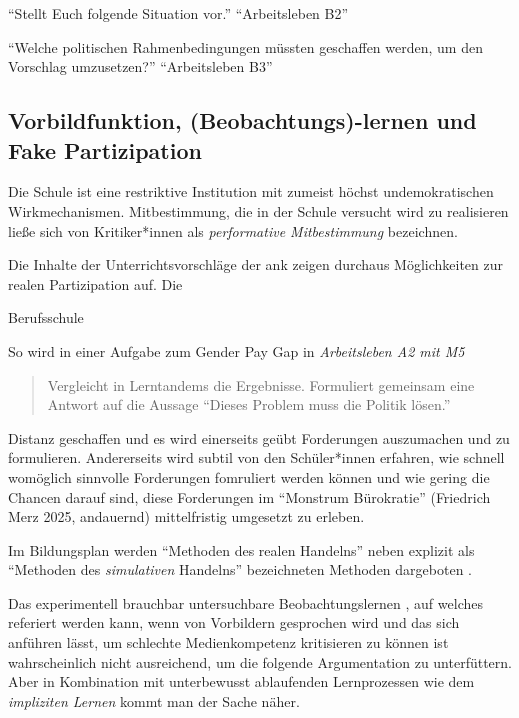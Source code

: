 \enquote{Stellt Euch folgende Situation vor.} \enquote{Arbeitsleben B2}

\enquote{Welche politischen Rahmenbedingungen müssten geschaffen werden, um den Vorschlag umzusetzen?} \enquote{Arbeitsleben B3}

\subsection{Vorbildfunktion, (Beobachtungs)-lernen und Fake Partizipation \label{fakePartizipation}}
Die Schule ist eine restriktive Institution mit zumeist höchst undemokratischen Wirkmechanismen.
Mitbestimmung, die in der Schule versucht wird zu realisieren ließe sich von Kritiker*innen als \emph{performative Mitbestimmung} bezeichnen. 


Die Inhalte der Unterrichtsvorschläge der \gls{ank} zeigen durchaus Möglichkeiten zur realen Partizipation auf. Die  

Berufsschule 

So wird in einer Aufgabe zum Gender Pay Gap in \emph{Arbeitsleben A2 mit M5}

\begin{quote}
    Vergleicht in Lerntandems die Ergebnisse. Formuliert gemeinsam eine Antwort auf die Aussage \enquote{Dieses Problem muss die Politik lösen.}
\end{quote}

Distanz geschaffen und es wird einerseits geübt Forderungen auszumachen und zu formulieren. Andererseits wird subtil von den Schüler*innen erfahren, wie schnell womöglich sinnvolle Forderungen fomruliert werden können und wie gering die Chancen darauf sind, diese Forderungen im \enquote{Monstrum Bürokratie} (Friedrich Merz 2025, andauernd) mittelfristig umgesetzt zu erleben. 

Im Bildungsplan werden \enquote{Methoden des realen Handelns} \autocite[13]{bplan} neben explizit als \enquote{Methoden des \emph{simulativen} Handelns} bezeichneten Methoden dargeboten \autocite[14]{bplan}.

Das experimentell brauchbar untersuchbare Beobachtungslernen \autocite{Bandura.1977}, auf welches referiert werden kann, wenn von Vorbildern gesprochen wird und das sich anführen lässt, um schlechte Medienkompetenz kritisieren zu können ist wahrscheinlich nicht ausreichend, um die folgende Argumentation zu unterfüttern.
Aber in Kombination mit unterbewusst ablaufenden Lernprozessen wie dem \emph{impliziten Lernen} \autocite[82-93]{Kiesel2012} kommt man der Sache näher.


